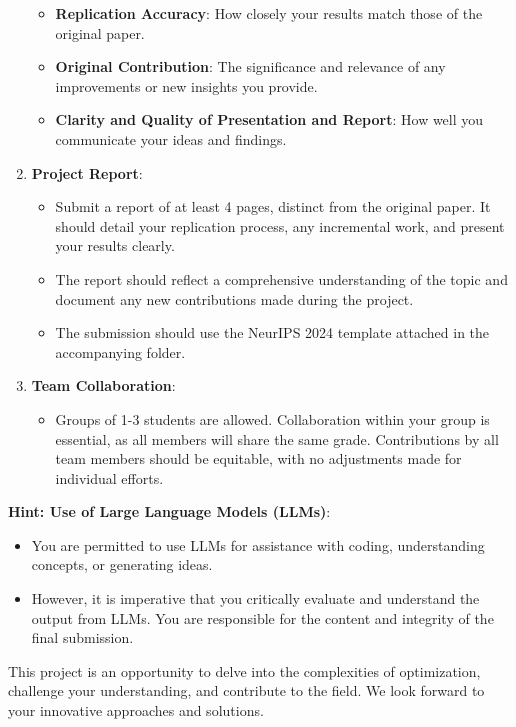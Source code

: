 \documentclass[a4paper, 11pt]{article}
\begin{document}
\begin{enumerate}[label=\arabic*.]
	\begin{itemize}
		\item \textbf{Replication Accuracy}: How closely your results match those of the original paper.
		\item \textbf{Original Contribution}: The significance and relevance of any improvements or new insights you provide.
		\item \textbf{Clarity and Quality of Presentation and Report}: How well you communicate your ideas and findings.
	\end{itemize}
	
	\item \textbf{Project Report}:
	\begin{itemize}
		\item Submit a report of at least 4 pages, distinct from the original paper. It should detail your replication process, any incremental work, and present your results clearly.
		\item The report should reflect a comprehensive understanding of the topic and document any new contributions made during the project.
		\item The submission should use the NeurIPS 2024 template attached in the accompanying folder.
	\end{itemize}
	
	\item \textbf{Team Collaboration}:
	\begin{itemize}
		\item Groups of 1-3 students are allowed. Collaboration within your group is essential, as all members will share the same grade. Contributions by all team members should be equitable, with no adjustments made for individual efforts.
	\end{itemize}
	
\end{enumerate}


\textbf{Hint: Use of Large Language Models (LLMs)}:
\begin{itemize}
	\item You are permitted to use LLMs for assistance with coding, understanding concepts, or generating ideas.
	\item However, it is imperative that you critically evaluate and understand the output from LLMs. You are responsible for the content and integrity of the final submission.
\end{itemize}
This project is an opportunity to delve into the complexities of optimization, challenge your understanding, and contribute to the field. We look forward to your innovative approaches and solutions.
\end{document}
